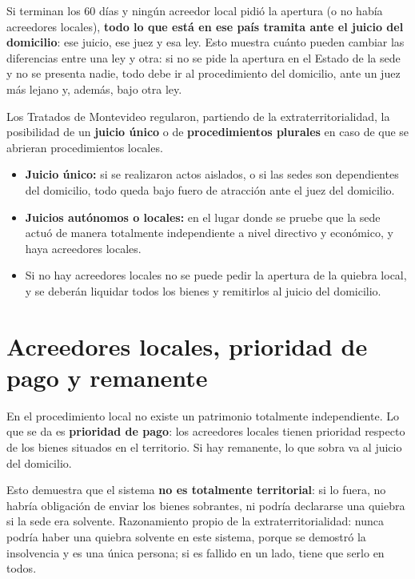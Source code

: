 \documentclass[12pt,oneside]{book}
\begin{document}
Si terminan los 60 días y ningún acreedor local pidió la apertura (o no había acreedores locales), \textbf{todo lo que está en ese país tramita ante el juicio del domicilio}: ese juicio, ese juez y esa ley. Esto muestra cuánto pueden cambiar las diferencias entre una ley y otra: si no se pide la apertura en el Estado de la sede y no se presenta nadie, todo debe ir al procedimiento del domicilio, ante un juez más lejano y, además, bajo otra ley.

\begin{important}
Los Tratados de Montevideo regularon, partiendo de la extraterritorialidad, la posibilidad de un \textbf{juicio único} o de \textbf{procedimientos plurales} en caso de que se abrieran procedimientos locales.
\begin{itemize}
    \item \textbf{Juicio único:} si se realizaron actos aislados, o si las sedes son dependientes del domicilio, todo queda bajo fuero de atracción ante el juez del domicilio.
    \item \textbf{Juicios autónomos o locales:} en el lugar donde se pruebe que la sede actuó de manera totalmente independiente a nivel directivo y económico, y haya acreedores locales.
    \item Si no hay acreedores locales no se puede pedir la apertura de la quiebra local, y se deberán liquidar todos los bienes y remitirlos al juicio del domicilio.
\end{itemize}
\end{important}

\section{Acreedores locales, prioridad de pago y remanente}

En el procedimiento local no existe un patrimonio totalmente independiente. Lo que se da es \textbf{prioridad de pago}: los acreedores locales tienen prioridad respecto de los bienes situados en el territorio. Si hay remanente, lo que sobra va al juicio del domicilio.

Esto demuestra que el sistema \textbf{no es totalmente territorial}: si lo fuera, no habría obligación de enviar los bienes sobrantes, ni podría declararse una quiebra si la sede era solvente. Razonamiento propio de la extraterritorialidad: nunca podría haber una quiebra solvente en este sistema, porque se demostró la insolvencia y es una única persona; si es fallido en un lado, tiene que serlo en todos.
\end{document}
